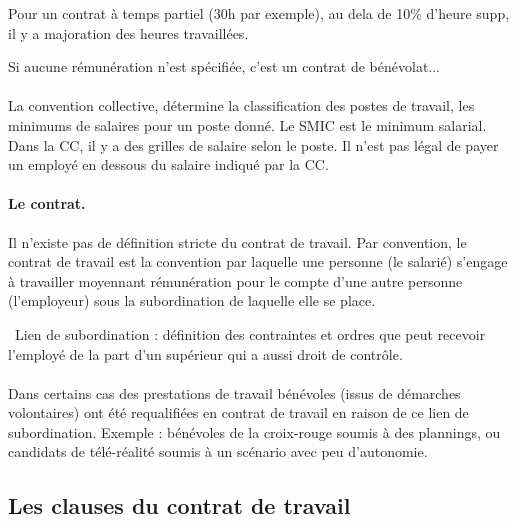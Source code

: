 	Pour un contrat à temps partiel (30h par exemple), au dela de 10\% d’heure supp, il y a majoration des heures travaillées.

	Si aucune rémunération n'est spécifiée, c’est un contrat de bénévolat...

	\paragraph{}
	La convention collective, détermine la classification des postes de travail, les minimums de salaires pour un poste donné.
	Le SMIC est le minimum salarial.
	Dans la CC, il y a des grilles de salaire selon le poste.
	Il n’est pas légal de payer un employé en dessous du salaire indiqué par la CC.

	\paragraph{Le contrat.}
	Il n’existe pas de définition stricte du contrat de travail.
	Par convention, le contrat de travail est la convention par laquelle une personne (le salarié) s’engage à travailler moyennant rémunération pour le compte d’une autre personne (l’employeur) sous la subordination de laquelle elle se place.

	\textrightarrow\ Lien de subordination : définition des contraintes et ordres que peut recevoir l’employé de la part d’un supérieur qui a aussi droit de contrôle.

	\paragraph{}
	Dans certains cas des prestations de travail bénévoles (issus de démarches volontaires) ont été requalifiées en contrat de travail en raison de ce lien de subordination.
	Exemple : bénévoles de la croix-rouge soumis à des plannings, ou candidats de télé-réalité soumis à un scénario avec peu d'autonomie.

\subsection{Les clauses du contrat de travail}

